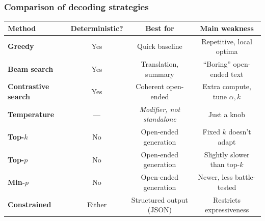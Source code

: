 \documentclass[aspectratio=169]{beamer}
\begin{document}
\begin{frame}
\frametitle{Comparison of decoding strategies}

\vspace{-0.2cm}
\renewcommand{\arraystretch}{1.22}
\begin{center}
\small
\begin{tabular}{>{\bfseries}l c c c}
  \textbf{Method} & \textbf{Deterministic?} & \textbf{Best for} & \textbf{Main weakness} \\
  \hline
  \textcolor{popblue}{Greedy} & Yes & Quick baseline & Repetitive, local optima \\[2pt]
  \textcolor{popblue}{Beam search} & Yes & Translation, summary & ``Boring'' open-ended text \\[2pt]
  \textcolor{popblue}{Contrastive search} & Yes & Coherent open-ended & Extra compute, tune $\alpha, k$ \\[2pt]
  \textcolor{sampred}{Temperature} & --- & \textit{Modifier, not standalone} & Just a knob \\[2pt]
  \textcolor{orange1}{Top-$k$} & No & Open-ended generation & Fixed $k$ doesn't adapt \\[2pt]
  \textcolor{paramgreen}{Top-$p$} & No & Open-ended generation & Slightly slower than top-$k$ \\[2pt]
  \textcolor{violet1}{Min-$p$} & No & Open-ended generation & Newer, less battle-tested \\[2pt]
  \textcolor{orange1}{Constrained} & Either & Structured output (JSON) & Restricts expressiveness \\
  \hline
\end{tabular}
\end{center}

\vspace{0.25cm}
\begin{center}
\end{center}
\end{frame}
\end{document}
